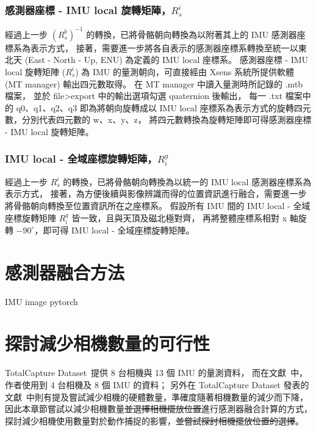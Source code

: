 \subsubsection{感測器座標 - IMU local 旋轉矩陣，$R^i_s$}
經過上一步 $(R^b_s)^{-1}$ 的轉換，已將骨骼朝向轉換為以附著其上的 IMU 感測器座標系為表示方式，
接著，需要進一步將各自表示的感測器座標系轉換至統一以東北天 (East - North - Up, ENU) 為定義的 IMU local 座標系。
感測器座標 - IMU local 旋轉矩陣 ($R^i_s$) 為 IMU 的量測朝向，可直接經由 Xsens 系統所提供軟體 (MT manager) 輸出四元數取得。
在 MT manager 中讀入量測時所記錄的 .mtb 檔案，
並於 file>export 中的輸出選項勾選 quaternion 後輸出，
每一 .txt 檔案中的 q0、q1、q2、q3 即為將朝向旋轉成以 IMU local 座標系為表示方式的旋轉四元數，分別代表四元數的 w、x、y、z，
將四元數轉換為旋轉矩陣即可得感測器座標 - IMU local 旋轉矩陣。

\subsubsection{IMU local - 全域座標旋轉矩陣，$R^g_i$}
經過上一步 $R^i_s$ 的轉換，已將骨骼朝向轉換為以統一的 IMU local 感測器座標系為表示方式，
接著，為方便後續與影像辨識而得的位置資訊進行融合，需要進一步將骨骼朝向轉換至位置資訊所在之座標系。
假設所有 IMU 間的 IMU local - 全域座標旋轉矩陣 $R^g_i$ 皆一致，且與天頂及磁北極對齊，
再將整體座標系相對 x 軸旋轉 $-90^{\circ}$，即可得 IMU local - 全域座標旋轉矩陣。

\section{感測器融合方法}
IMU image pytorch

\section{探討減少相機數量的可行性}
TotalCapture Dataset~\cite{Trumble:BMVC:2017}提供 8 台相機與 13 個 IMU 的量測資料，
而在文獻~\cite{zhang2020fusing}中，作者使用到 4 台相機及 8 個 IMU 的資料；
另外在 TotalCapture Dataset 發表的文獻~\cite{Trumble:BMVC:2017}中則有提及嘗試減少相機的硬體數量，準確度隨著相機數量的減少而下降，
因此本章節嘗試以減少相機數量\sout{並選擇相機擺放位置}進行感測器融合計算的方式，
探討減少相機使用數量對於動作捕捉的影響，\sout{並嘗試探討相機擺放位置的選擇}。

